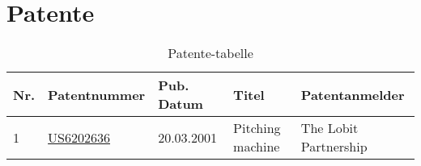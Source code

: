 \section{Patente}

\begin{table}[h!]
	\centering
	\begin{tabular}{l l l l l}
		Nr. & Patentnummer & Pub. Datum & Titel & Patentanmelder \\
		\hline
        
        1 & \href{http://www.google.com/patents/US6202636}{US6202636} & 20.03.2001 & Pitching machine & The Lobit Partnership  \\
        
        
        
	\end{tabular}
	\caption{Patente-tabelle}
	\label{tab:quelle}
\end{table}
